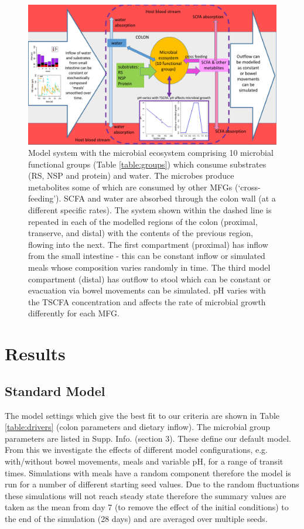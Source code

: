 \documentclass[a4paper]{article}
\begin{document}
\begin{figure}
    \centering
   \includegraphics[scale=0.3]{images/microbeEco4.pdf}
   \caption{Model system with the microbial ecosystem comprising 10 microbial functional groups (Table \ref{table:groups}) which consume substrates (RS, NSP and protein) and water. The microbes produce metabolites some of which are consumed by other MFGs (`cross-feeding'). SCFA and water are absorbed through the colon wall (at a different specific rates). The system shown within the dashed line is repeated in each of the modelled regions of the colon (proximal, transerve, and distal) with the contents of the previous region, flowing into the next. The first compartment (proximal) has inflow from the small intestine - this can be constant inflow or simulated meals whose composition varies randomly in time. The third model compartment (distal) has outflow to stool which can be constant or evacuation via bowel movements can be simulated. pH varies with the TSCFA concentration and affects the rate of microbial growth differently for each MFG.
    }
    \label{fig:schematic}
\end{figure}



\section*{Results} 

\subsection*{Standard Model}
The model settings which give the best fit to our criteria are shown in Table \ref{table:drivers} (colon parameters and dietary inflow). The microbial group parameters are listed in Supp. Info. (section 3). These define our default model. From this we investigate the effects of different model configurations, e.g. with/without bowel movements, meals and variable pH, for a range of transit times.
Simulations with meals have a random component therefore the model is run for a number of different starting seed values.
Due to the random fluctuations these simulations will not reach steady state therefore the summary values are taken as the mean from day 7 (to remove the effect of the initial conditions) to the end of the simulation (28 days) and are averaged over multiple seeds.
\end{document}
